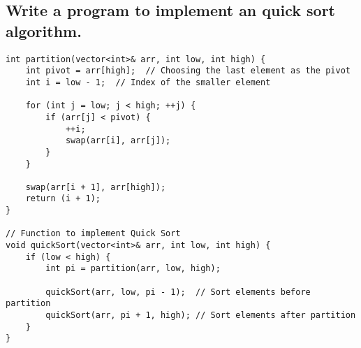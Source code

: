 \subsection{Write a program to implement an quick sort algorithm.}
\begin{tcolorbox}[title=]
\begin{verbatim}
int partition(vector<int>& arr, int low, int high) {
    int pivot = arr[high];  // Choosing the last element as the pivot
    int i = low - 1;  // Index of the smaller element

    for (int j = low; j < high; ++j) {
        if (arr[j] < pivot) {
            ++i;
            swap(arr[i], arr[j]);
        }
    }

    swap(arr[i + 1], arr[high]);
    return (i + 1);
}

// Function to implement Quick Sort
void quickSort(vector<int>& arr, int low, int high) {
    if (low < high) {
        int pi = partition(arr, low, high);

        quickSort(arr, low, pi - 1);  // Sort elements before partition
        quickSort(arr, pi + 1, high); // Sort elements after partition
    }
}
\end{verbatim}
\end{tcolorbox}

